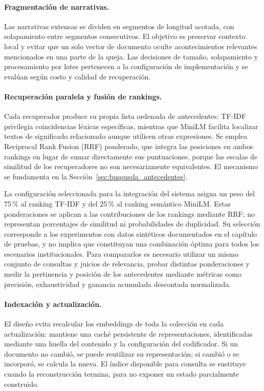 	\paragraph{Fragmentación de narrativas.}
	Las narrativas extensas se dividen en segmentos de longitud acotada, con solapamiento entre
	segmentos consecutivos. El objetivo es preservar contexto local y evitar que un solo vector
	de documento oculte acontecimientos relevantes mencionados en una parte de la queja.
	Las decisiones de tamaño, solapamiento y procesamiento por lotes pertenecen a la
	configuración de implementación y se evalúan según costo y calidad de recuperación.

	\paragraph{Recuperación paralela y fusión de rankings.}
	Cada recuperador produce su propia lista ordenada de antecedentes: TF-IDF privilegia
	coincidencias léxicas específicas, mientras que MiniLM facilita localizar textos de
	significado relacionado aunque utilicen otras expresiones. Se emplea Reciprocal Rank
	Fusion (RRF) ponderado, que integra las posiciones en ambos rankings en lugar de sumar
	directamente sus puntuaciones, porque las escalas de similitud de los recuperadores no
	son necesariamente equivalentes. El mecanismo se fundamenta en la
	Sección~\ref{sec:busqueda_antecedentes}.

	La configuración seleccionada para la integración del sistema asigna un peso
	del 75\,\% al ranking TF-IDF y del 25\,\% al ranking semántico MiniLM.
	Estas ponderaciones se aplican a las contribuciones de los rankings mediante RRF;
	no representan porcentajes de similitud ni probabilidades de duplicidad.
	Su selección corresponde a los experimentos con datos sintéticos documentados en
	el capítulo de pruebas, y no implica que constituyan una combinación óptima para
	todos los escenarios institucionales. Para compararlos es necesario utilizar un mismo
	conjunto de consultas y juicios de relevancia, probar distintas ponderaciones y medir
	la pertinencia y posición de los antecedentes mediante métricas como precisión,
	exhaustividad y ganancia acumulada descontada normalizada.

	\paragraph{Indexación y actualización.}
	El diseño evita recalcular los embeddings de toda la colección en cada actualización:
	mantiene una caché persistente de representaciones, identificadas mediante una huella
	del contenido y la configuración del codificador. Si un documento no cambió,
	se puede reutilizar su representación; si cambió o se incorporó, se calcula la nueva.
	El índice disponible para consulta se sustituye cuando la reconstrucción termina,
	para no exponer un estado parcialmente construido.

